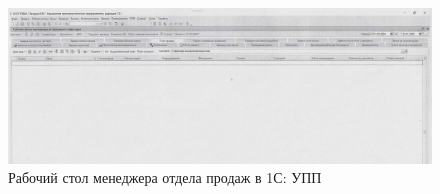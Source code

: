  


%
%

\begin{figure}
\begin{center}
\includegraphics[height=0.25\textheight, angle=90, keepaspectratio]{Pics/Рабочее место менеджера.jpg}
\end{center}
\caption{Рабочий стол менеджера отдела продаж в 1С: УПП}
\label{pic:Рабочее место менеджера.jpg}
\end{figure}
\clearpage

